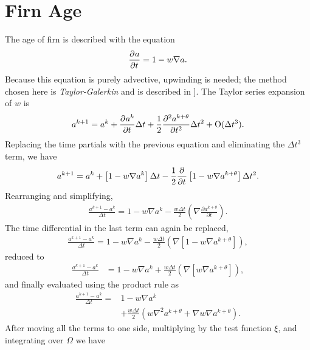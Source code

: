 \section{Firn Age}

The age of firn is described with the equation
\begin{align}
  \frac{\partial^{} a}{\partial t^{} } = 1 - w \nabla{a}.
\end{align}
Because this equation is purely advective, upwinding is needed; the method chosen here is \emph{Taylor-Galerkin} and is described in \citep{codina_1992}].  The Taylor series expansion of $w$ is
\begin{align*}
  a^{k+1} = a^{k} + \frac{\partial^{} a^k}{\partial t^{} }\Delta t + 
            \frac{1}{2}\frac{\partial^2 a^{k+\theta}}{\partial t^2}\Delta t^2 + 
            \mathrm{O} (\Delta t^3).
\end{align*}
Replacing the time partials with the previous equation and eliminating the $\Delta t^3$ term, we have
\begin{align*}
  a^{k+1} = a^{k} + \left[1 - w \nabla{a}^k \right] \Delta t
            - \frac{1}{2}\frac{\partial^{} }{\partial t^{} }
              \left[1 - w \nabla{a}^{k+\theta} \right] \Delta t^2. 
\end{align*}
Rearranging and simplifying,
\begin{align*}
  \frac{a^{k+1} - a^{k}}{\Delta t} = 1 - w \nabla{a}^k
        - \frac{w \Delta t}{2} 
          \left( \nabla \frac{\partial a^{k+\theta}}{\partial t} \right).
\end{align*}
The time differential in the last term can again be replaced, 
\begin{align*}
  \frac{a^{k+1} - a^{k}}{\Delta t} = 1 - w \nabla{a}^k
        - \frac{w \Delta t}{2} 
          \left( \nabla [1 - w \nabla a^{k+\theta}] \right),
\end{align*}
reduced to
\begin{align*}
  \frac{a^{k+1} - a^{k}}{\Delta t} &= 1 - w \nabla{a}^k
        + \frac{w \Delta t}{2} 
          \left( \nabla [w \nabla a^{k+\theta}] \right),
\end{align*}
and finally evaluated using the product rule as
\begin{align*}
  \frac{a^{k+1} - a^{k}}{\Delta t} = &1 - w \nabla{a}^k\\
        &+ \frac{w \Delta t}{2} 
          \left( w \nabla^2 a^{k+\theta} + \nabla w \nabla a^{k+\theta} \right).
\end{align*}
After moving all the terms to one side, multiplying by the test function $\xi$, and integrating over $\Omega$ we have
